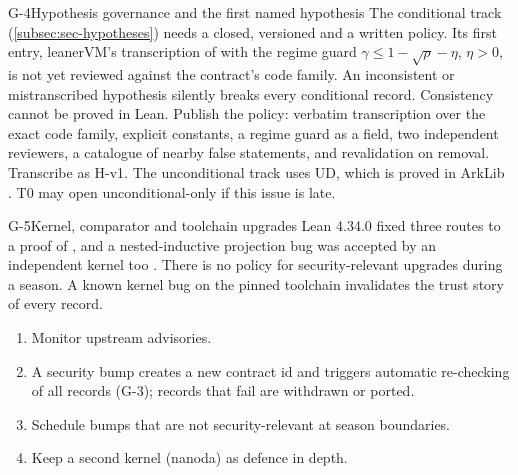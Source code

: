 \begin{issue}{G-4}{Hypothesis governance and the first named hypothesis}
\IRprob The conditional track (\cref{subsec:sec-hypotheses}) needs a closed, versioned
 and a written policy. Its first entry, leanerVM's 
transcription of \cite[Thm.~4.6]{BCHKS25} with the regime guard $\gamma\le1-\sqrt\rho-\eta$,
$\eta>0$, is not yet reviewed against the contract's code family.
\IRwhy An inconsistent or mistranscribed hypothesis silently breaks every conditional record.
Consistency cannot be proved in Lean.
\IRres Publish the policy: verbatim transcription over the exact code family, explicit constants, a
regime guard as a field, two independent reviewers, a catalogue of nearby false statements, and
revalidation on removal. Transcribe  as H-v1. The unconditional track uses UD,
which is proved in ArkLib \cite{BCIKS20}. T0 may open unconditional-only if this issue is late.
\end{issue}

\begin{issue}{G-5}{Kernel, comparator and toolchain upgrades}
\IRprob Lean 4.34.0 fixed three routes to a proof of , and a nested-inductive
projection bug was accepted by an independent kernel too
\cite{lean4340,brossard2026leanproj}. There is no policy for security-relevant upgrades during a
season.
\IRwhy A known kernel bug on the pinned toolchain invalidates the trust story of every record.
\IRres
\begin{enumerate}[nosep,leftmargin=1.4em]
\item Monitor upstream advisories.
\item A security bump creates a new contract id and triggers automatic re-checking of all records
  (G-3); records that fail are withdrawn or ported.
\item Schedule bumps that are not security-relevant at season boundaries.
\item Keep a second kernel (nanoda) as defence in depth.
\end{enumerate}
\end{issue}

